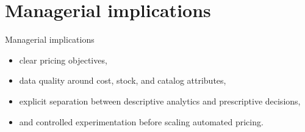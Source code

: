 \documentclass[aspectratio=169]{beamer}
\begin{document}
\section{Managerial implications}

\begin{frame}{Managerial implications}
  \begin{itemize}
    \item clear pricing objectives,
    \item data quality around cost, stock, and catalog attributes,
    \item explicit separation between descriptive analytics and prescriptive decisions,
    \item and controlled experimentation before scaling automated pricing.
  \end{itemize}
\end{frame}
\end{document}
